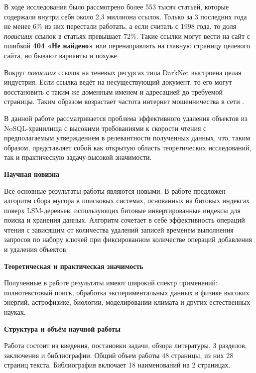 В ходе исследования было рассмотрено более 553 тысяч статьей, которые содержали
внутри себя около 2,3 миллиона ссылок. Только за 3 последних года не менее 6\%
из них перестали работать, а если считать с 1998 года, то доля \textit{повисших}
ссылок в статьях превышает 72\%. Такие ссылки могут вести на сайт с
ошибкой \textbf{404 «Не найдено»} или перенаправлять на главную страницу целевого
сайта, но бывают варианты и похуже.

Вокруг \textit{повисших} ссылок на теневых ресурсах типа DarkNet выстроена целая
индустрия. Если ссылка ведёт на несуществующий документ, то его могут восстановить
с таким же доменным именем и адресацией до требуемой страницы. Таким образом
возрастает частота интернет мошенничества в сети \cite{Fraud}.

В данной работе рассматривается проблема эффективного удаления объектов из
NoSQL-хранилища с высокими требованиями к скорости чтения с предполагаемым
утверждением в релевантности полученных данных, что, таким образом, представляет
собой как открытую область теоретических исследований, так и практическую задачу
высокой значимости.

\textbf{Научная новизна}

Все основные результаты работы являются новыми. В работе предложен алгоритм
сбора мусора в поисковых системах, основанных на битовых индексах
поверх LSM-деревьев, использующих битовые инвертированные индексы для поиска и
хранения данных. Алгоритм сочетает в себе эффективность операций чтения с
зависящим от количества удалений записей временем выполнения запросов по
набору ключей при фиксированном количестве операций добавления и удаления
объектов.

\textbf{Теоретическая и практическая значимость}

Полученные в работе результаты имеют широкий спектр применений: полнотекстовый поиск,
обработка экспериментальных данных в физике высоких энергий, астрофизике, биологии,
моделировании климата и других естественных науках.

\textbf{Структура и объём научной работы}

Работа состоит из введения, постановки задачи, обзора литературы, 3
разделов, заключения и библиографии. Общий объем работы 48 страницы, из
них 28 страниц текста. Библиография включает 18 наименований на 2 страницах.
